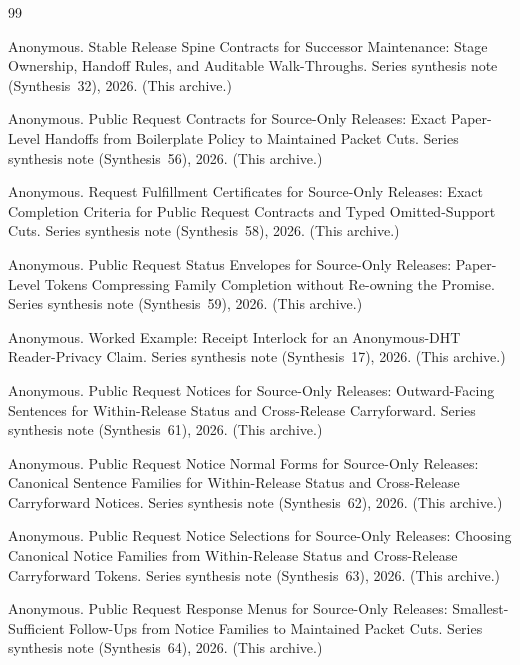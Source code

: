 \documentclass[11pt]{article}
\begin{document}
\begin{thebibliography}{99}\small

Anonymous.
\newblock Stable Release Spine Contracts for Successor Maintenance: Stage Ownership, Handoff Rules, and Auditable Walk-Throughs.
\newblock Series synthesis note (Synthesis~32), 2026. (This archive.)

Anonymous.
\newblock Public Request Contracts for Source-Only Releases: Exact Paper-Level Handoffs from Boilerplate Policy to Maintained Packet Cuts.
\newblock Series synthesis note (Synthesis~56), 2026. (This archive.)

Anonymous.
\newblock Request Fulfillment Certificates for Source-Only Releases: Exact Completion Criteria for Public Request Contracts and Typed Omitted-Support Cuts.
\newblock Series synthesis note (Synthesis~58), 2026. (This archive.)

Anonymous.
\newblock Public Request Status Envelopes for Source-Only Releases: Paper-Level Tokens Compressing Family Completion without Re-owning the Promise.
\newblock Series synthesis note (Synthesis~59), 2026. (This archive.)

Anonymous.
\newblock Worked Example: Receipt Interlock for an Anonymous-DHT Reader-Privacy Claim.
\newblock Series synthesis note (Synthesis~17), 2026. (This archive.)

Anonymous.
\newblock Public Request Notices for Source-Only Releases: Outward-Facing Sentences for Within-Release Status and Cross-Release Carryforward.
\newblock Series synthesis note (Synthesis~61), 2026. (This archive.)

Anonymous.
\newblock Public Request Notice Normal Forms for Source-Only Releases: Canonical Sentence Families for Within-Release Status and Cross-Release Carryforward Notices.
\newblock Series synthesis note (Synthesis~62), 2026. (This archive.)

Anonymous.
\newblock Public Request Notice Selections for Source-Only Releases: Choosing Canonical Notice Families from Within-Release Status and Cross-Release Carryforward Tokens.
\newblock Series synthesis note (Synthesis~63), 2026. (This archive.)

Anonymous.
\newblock Public Request Response Menus for Source-Only Releases: Smallest-Sufficient Follow-Ups from Notice Families to Maintained Packet Cuts.
\newblock Series synthesis note (Synthesis~64), 2026. (This archive.)


\end{thebibliography}
\end{document}
